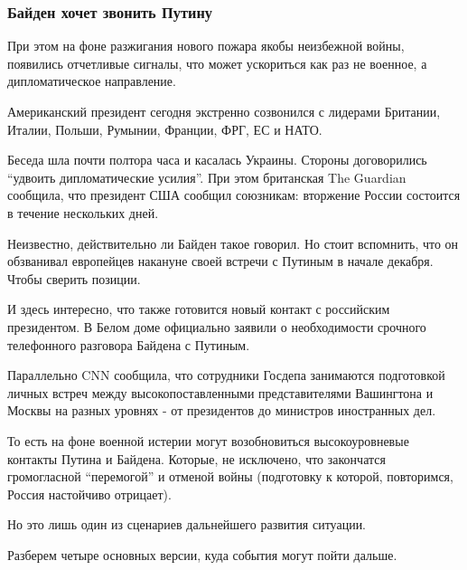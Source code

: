  
 
 
 
 

\subsubsection{Байден хочет звонить Путину}

При этом на фоне разжигания нового пожара якобы неизбежной войны, появились
отчетливые сигналы, что может ускориться как раз не военное, а дипломатическое
направление.

Американский президент сегодня экстренно созвонился с лидерами Британии,
Италии, Польши, Румынии, Франции, ФРГ, ЕС и НАТО.

Беседа шла почти полтора часа и касалась Украины. Стороны договорились \enquote{удвоить
дипломатические усилия}. При этом британская The Guardian сообщила, что
президент США сообщил союзникам: вторжение России состоится в течение
нескольких дней. 

Неизвестно, действительно ли Байден такое говорил. Но стоит вспомнить, что он
обзванивал европейцев накануне своей встречи с Путиным в начале декабря. Чтобы
сверить позиции. 

И здесь интересно, что также готовится новый контакт с российским президентом.
В Белом доме официально заявили о необходимости срочного телефонного разговора
Байдена с Путиным.

Параллельно CNN сообщила, что сотрудники Госдепа занимаются подготовкой личных
встреч между высокопоставленными представителями Вашингтона и Москвы на разных
уровнях - от президентов до министров иностранных дел.

То есть на фоне военной истерии могут возобновиться высокоуровневые контакты
Путина и Байдена. Которые, не исключено, что закончатся громогласной
\enquote{перемогой} и отменой войны (подготовку к которой, повторимся, Россия
настойчиво отрицает).

Но это лишь один из сценариев дальнейшего развития ситуации.

Разберем четыре основных версии, куда события могут пойти дальше. 

